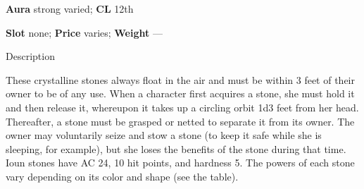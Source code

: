 \textbf{Aura} strong varied;\textbf{ CL }12th
				
\textbf{Slot} none; \textbf{Price} varies; \textbf{Weight }---
				
Description
				
These crystalline stones always float in the air and must be within 3 feet of their owner to be of any use. When a character first acquires a stone, she must hold it and then release it, whereupon it takes up a circling orbit 1d3 feet from her head. Thereafter, a stone must be grasped or netted to separate it from its owner. The owner may voluntarily seize and stow a stone (to keep it safe while she is sleeping, for example), but she loses the benefits of the stone during that time. Ioun stones have AC 24, 10 hit points, and hardness 5. The powers of each stone vary depending on its color and shape (see the table).
				

